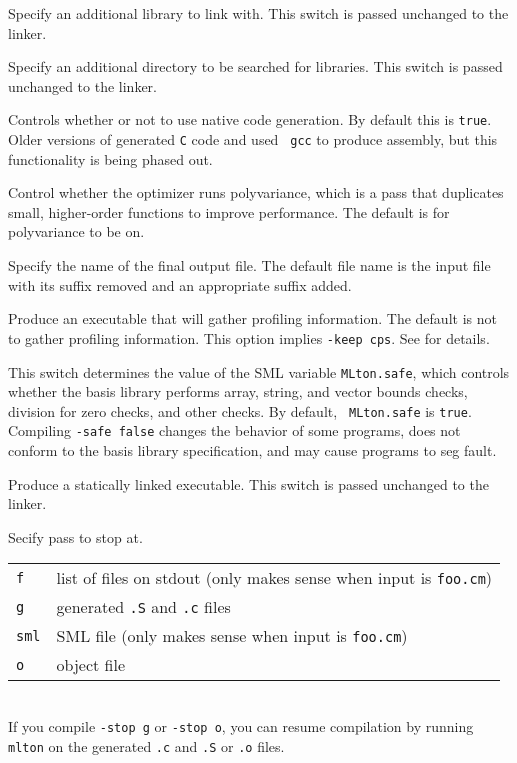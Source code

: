 \begin{description}
Specify an additional library to link with.
This switch is passed unchanged to the linker.

Specify an additional directory to be searched for libraries.
This switch is passed unchanged to the linker.

Controls whether or not to use native code generation.  By default this is
{\tt true}.  Older versions of {\mlton} generated {\tt C} code and used {\tt
gcc} to produce assembly, but this functionality is being phased out.

Control whether the optimizer runs polyvariance, which is a pass that duplicates
small, higher-order functions to improve performance.  The default is for
polyvariance to be on.

Specify the name of the final output file.
The default file name is the input file with its
suffix removed and an appropriate suffix added.

Produce an executable that will gather profiling information.  The default is
not to gather profiling information.  This option implies {\tt -keep cps}.
See  for details.

This switch determines the value of the SML variable {\tt MLton.safe}, which
controls whether the basis library performs array, string, and vector bounds
checks, division for zero checks, and other checks.  By default, {\tt
MLton.safe} is {\tt true}.  Compiling {\tt -safe false} changes the behavior of
some programs, does not conform to the basis library specification, and may
cause programs to seg fault.

Produce a statically linked executable.  This switch is passed unchanged to the
linker.

Secify pass to stop at.\\
\begin{tabular}{ll}
{\tt f} & list of files on stdout (only makes sense when input is {\tt foo.cm})\\
{\tt g} & generated {\tt .S} and {\tt .c} files\\
{\tt sml} & SML file (only makes sense when input is {\tt foo.cm})\\
{\tt o} & object file\\
\end{tabular}\\
If you compile {\tt -stop g} or {\tt -stop o}, you can resume compilation by
running {\tt mlton} on the generated {\tt .c} and {\tt .S} or {\tt .o} files.


\end{description}
